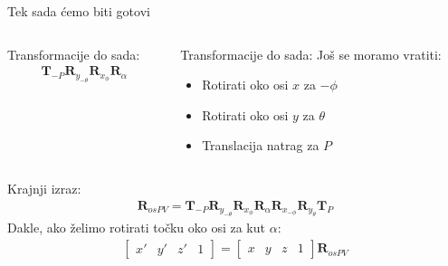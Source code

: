 \documentclass[9pt]{beamer}
\begin{document}
\begin{frame}{Tek sada ćemo biti gotovi}
	\begin{columns}
		\begin{column}{0.48\textwidth}
			\begin{block}{Transformacije do sada:}
				\begin{align*}
				\mathbf{T}_{-P}\mathbf{R}_{y_{-\theta}}\mathbf{R}_{x_{\phi}}\mathbf{R}_{\alpha}
				\end{align*}
			\end{block}
		\end{column}
		\begin{column}{0.48\textwidth}
			Transformacije do sada:
			Još se moramo vratiti:
			\begin{itemize}
				\item Rotirati oko osi $x$ za $-\phi$
				\item Rotirati oko osi $y$ za $\theta$
				\item Translacija natrag za $P$
			\end{itemize}
		\end{column}
	\end{columns}
	\begin{block}{Krajnji izraz:}
		\begin{align*}
		\mathbf{R}_{osPV} = \mathbf{T}_{-P}\mathbf{R}_{y_{-\theta}}\mathbf{R}_{x_{\phi}}\mathbf{R}_{\alpha}\mathbf{R}_{x_{-\phi}}\mathbf{R}_{y_{\theta}}\mathbf{T}_{P}
		\end{align*}
		Dakle, ako želimo rotirati točku oko osi za kut $\alpha$:
		\begin{align*}
		\left[ \begin{array}{cccc} x' & y' & z' & 1 \end{array} \right] = \left[ \begin{array}{cccc}
		x & y & z & 1 \end{array} \right] \mathbf{R}_{osPV}
		\end{align*}
	\end{block}
\end{frame}
\end{document}
